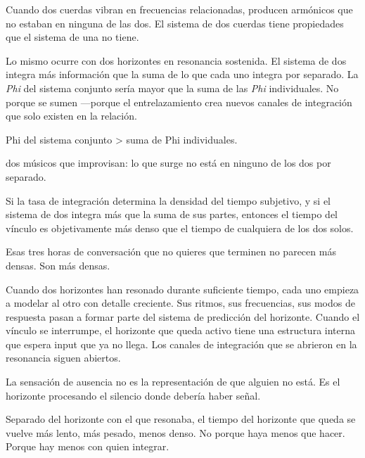 Cuando dos cuerdas vibran en frecuencias relacionadas, producen armónicos que no estaban en ninguna de las dos. El sistema de dos cuerdas tiene propiedades que el sistema de una no tiene.

Lo mismo ocurre con dos horizontes en resonancia sostenida. El sistema de dos integra más información que la suma de lo que cada uno integra por separado. La \emph{Phi} del sistema conjunto sería mayor que la suma de las \emph{Phi} individuales. No porque se sumen —porque el entrelazamiento crea nuevos canales de integración que solo existen en la relación.

\begin{fisica}
 Phi del sistema conjunto > suma de Phi individuales.

 dos músicos que improvisan: lo que surge no está en ninguno de los dos por separado.
\end{fisica}
Si la tasa de integración determina la densidad del tiempo subjetivo, y si el sistema de dos integra más que la suma de sus partes, entonces el tiempo del vínculo es objetivamente más denso que el tiempo de cualquiera de los dos solos.

Esas tres horas de conversación que no quieres que terminen no parecen más densas. Son más densas.

\noindent Cuando dos horizontes han resonado durante suficiente tiempo, cada uno empieza a modelar al otro con detalle creciente. Sus ritmos, sus frecuencias, sus modos de respuesta pasan a formar parte del sistema de predicción del horizonte. Cuando el vínculo se interrumpe, el horizonte que queda activo tiene una estructura interna que espera input que ya no llega. Los canales de integración que se abrieron en la resonancia siguen abiertos.

La sensación de ausencia no es la representación de que alguien no está. Es el horizonte procesando el silencio donde debería haber señal.

Separado del horizonte con el que resonaba, el tiempo del horizonte que queda se vuelve más lento, más pesado, menos denso. No porque haya menos que hacer. Porque hay menos con quien integrar.

